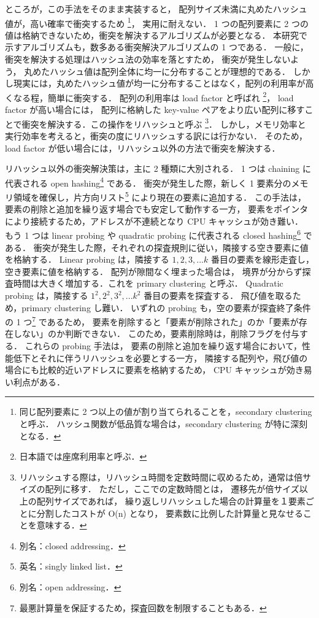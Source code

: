 ところが，この手法をそのまま実装すると，
配列サイズ未満に丸めたハッシュ値が，高い確率で衝突するため
\footnote{
同じ配列要素に 2 つ以上の値が割り当てられることを，secondary clustering と呼ぶ．
ハッシュ関数が低品質な場合は，secondary clustering が特に深刻となる．
}，
実用に耐えない．
1 つの配列要素に 2 つの値は格納できないため，衝突を解決するアルゴリズムが必要となる．
本研究で示すアルゴリズムも，数多ある衝突解決アルゴリズムの 1 つである．
一般に，
衝突を解決する処理はハッシュ法の効率を落とすため，
衝突が発生しないよう，
丸めたハッシュ値は配列全体に均一に分布することが理想的である．
しかし現実には，丸めたハッシュ値が均一に分布することはなく，配列の利用率が高くなる程，簡単に衝突する．
配列の利用率は load factor と呼ばれ
\footnote{
日本語では座席利用率と呼ぶ．
}，
load factor が高い場合には，
配列に格納した key-value ペアをより広い配列に移すことで衝突を解決する．この操作をリハッシュと呼ぶ
\footnote{
リハッシュする際は，リハッシュ時間を定数時間に収めるため，通常は倍サイズの配列に移す．
ただし，ここでの定数時間とは，
遷移先が倍サイズ以上の配列サイズであれば，
繰り返しリハッシュした場合の計算量を１要素ごとに分割したコストが O(n) となり，
要素数に比例した計算量と見なせることを意味する．
}．
しかし，メモリ効率と実行効率を考えると，衝突の度にリハッシュする訳には行かない．
そのため，load factor が低い場合には，リハッシュ以外の方法で衝突を解決する．

リハッシュ以外の衝突解決策は，主に 2 種類に大別される．
1 つは chaining に代表される open hashing\footnote{別名：closed addressing．} である．
衝突が発生した際，新しく 1 要素分のメモリ領域を確保し，片方向リスト\footnote{英名：singly linked list．} により現在の要素に追加する．
この手法は，
要素の削除と追加を繰り返す場合でも安定して動作する一方，
要素をポインタにより接続するため，アドレスが不連続となり CPU キャッシュが効き難い．
もう 1 つは linear probing や quadratic probing に代表される closed hashing\footnote{別名：open addressing．} である．
衝突が発生した際，それぞれの探査規則に従い，隣接する空き要素に値を格納する．
Linear probing は，隣接する $1, 2, 3, ... k$ 番目の要素を線形走査し，空き要素に値を格納する．
配列が隙間なく埋まった場合は，
境界が分からず探査時間は大きく増加する．これを primary clustering と呼ぶ．
Quadratic probing は，隣接する $1^2, 2^2, 3^2, ... k^2$ 番目の要素を探査する．
飛び値を取るため，primary clustering し難い．
いずれの probing も，空の要素が探査終了条件の 1 つ\footnote{最悪計算量を保証するため，探査回数を制限することもある．} であるため，
要素を削除すると「要素が削除された」のか「要素が存在しない」のか判断できない．
このため，要素削除時は，削除フラグを付与する．
これらの probing 手法は，
要素の削除と追加を繰り返す場合において，性能低下とそれに伴うリハッシュを必要とする一方，
隣接する配列や，飛び値の場合にも比較的近いアドレスに要素を格納するため，
CPU キャッシュが効き易い利点がある．

